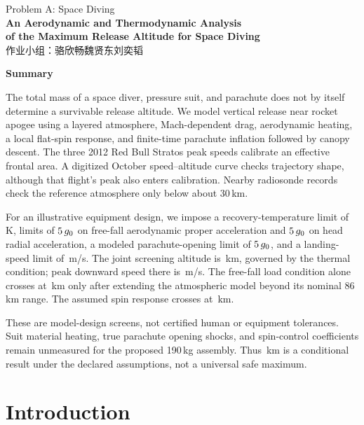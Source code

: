 \documentclass[12pt,a4paper]{article}
\numberwithin{equation}{section}
\renewenvironment{abstract}{\par\begin{center}\large\bfseries Summary\end{center}\normalsize\noindent\hspace*{\parindent}\ignorespaces}{\par}
\begin{document}
\thispagestyle{empty}
\begin{center}
{\normalsize Problem A: Space Diving}\\[12pt]
{\Large\bfseries An Aerodynamic and Thermodynamic Analysis\\[3pt] of the Maximum Release Altitude for Space Diving}\\[10pt]
{\groupfont 作业小组：骆欣畅\quad 魏贤东\quad 刘奕韬}\\[12pt]
\end{center}

\begin{abstract}
The total mass of a space diver, pressure suit, and parachute does not by itself determine a survivable release altitude. We model vertical release near rocket apogee using a layered atmosphere, Mach-dependent drag, aerodynamic heating, a local flat-spin response, and finite-time parachute inflation followed by canopy descent. The three 2012 Red Bull Stratos peak speeds calibrate an effective frontal area. A digitized October speed--altitude curve checks trajectory shape, although that flight's peak also enters calibration. Nearby radiosonde records check the reference atmosphere only below about 30\,km.

For an illustrative equipment design, we impose a recovery-temperature limit of \HeatLimit\,K, limits of $5\,g_0$ on free-fall aerodynamic proper acceleration and $5\,g_0$ on head radial acceleration, a modeled parachute-opening limit of $5\,g_0$, and a landing-speed limit of \LandingLimit\,m/s. The joint screening altitude is \MaxHeight\,km, governed by the thermal condition; peak downward speed there is \PeakV\,m/s. The free-fall load condition alone crosses at \LoadHeight\,km only after extending the atmospheric model beyond its nominal 86\,km range. The assumed spin response crosses at \SpinHeight\,km.

These are model-design screens, not certified human or equipment tolerances. Suit material heating, true parachute opening shocks, and spin-control coefficients remain unmeasured for the proposed 190\,kg assembly. Thus \MaxHeight\,km is a conditional result under the declared assumptions, not a universal safe maximum.
\end{abstract}

\newpage
{\normalsize\setlength{\parskip}{0pt}\tableofcontents}
\newpage
\section{Introduction}
\end{document}
